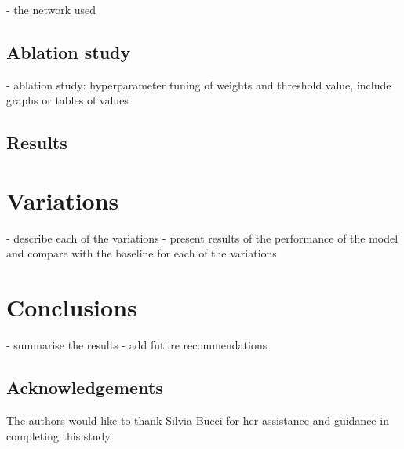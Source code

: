 \documentclass[10pt,twocolumn,letterpaper]{article}
\begin{document}
- the network used


\subsection{Ablation study}
\label{sec:ablation}

- ablation study: hyperparameter tuning of weights and threshold value, include graphs or tables of values

\subsection{Results}



\section{Variations}
\label{sec:variations}

- describe each of the variations
- present results of the performance of the model and compare with the baseline for each of the variations

\section{Conclusions}
\label{sec:conclusion}

- summarise the results
- add future recommendations

\subsection{Acknowledgements}
The authors would like to thank Silvia Bucci for her assistance and guidance in completing this study.


{\small


}
\end{document}
